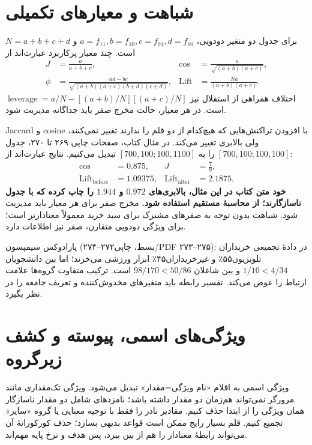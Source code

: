 \section{شباهت و معیارهای تکمیلی}

برای جدول دو متغیر دودویی، $a=f_{11},b=f_{10},c=f_{01},d=f_{00}$ و $N=a+b+c+d$ است. چند معیار پرکاربرد عبارت‌اند از
\begin{align*}
J&=\frac a{a+b+c},&\operatorname{cos}&=\frac a{\sqrt{(a+b)(a+c)}},\\
\phi&=\frac{ad-bc}{\sqrt{(a+b)(a+c)(b+d)(c+d)}},&\operatorname{Lift}&=\frac{Na}{(a+b)(a+c)}.
\end{align*}
اختلاف همراهی از استقلال نیز $\operatorname{leverage}=a/N-[(a+b)/N][(a+c)/N]$ است. در هر معیار، حالت مخرج صفر باید جداگانه مدیریت شود.

Jaccard و cosine با افزودن تراکنش‌هایی که هیچ‌کدام از دو قلم را ندارند تغییر نمی‌کنند، ولی بالابری تغییر می‌کند. در مثال کتاب، صفحات چاپی ۲۶۹ تا ۲۷۰، جدول $[700,100;100,100]$ را به $[700,100;100,1100]$ تبدیل می‌کنیم. نتایج عبارت‌اند از:
\begin{align*}
\operatorname{cos}&=0.875,& J&=\frac79,\\
\operatorname{Lift}_{\mathrm{before}}&=1.09375,&
\operatorname{Lift}_{\mathrm{after}}&=2.1875.
\end{align*}
\textbf{خود متن کتاب در این مثال، بالابری‌های $0.972$ و $1.944$ را چاپ کرده که با جدول ناسازگارند؛ از محاسبهٔ مستقیم استفاده شود.} مخرج صفر برای هر معیار باید مدیریت شود. شباهت بدون توجه به صفرهای مشترک برای سبد خرید معمولاً معنادارتر است؛ برای ویژگی دودویی متقارن، صفر نیز اطلاعات دارد.

پارادوکس سیمپسون (بسط، چاپی۲۷۲--۲۷۴/PDF ۲۷۳--۲۷۵): در دادهٔ تجمیعی خریداران تلویزیون۵۵٪ و غیرخریداران۴۵٪ ابزار ورزشی می‌خرند؛ اما بین دانشجویان $1/10<4/34$ و بین شاغلان $98/170<50/86$ است. ترکیب متفاوت گروه‌ها علامت ارتباط را عوض می‌کند. تفسیر رابطه باید متغیرهای مخدوش‌کننده و تعریف جامعه را در نظر بگیرد.

\section{ویژگی‌های اسمی، پیوسته و کشف زیرگروه}

ویژگی اسمی به اقلام «نام ویژگی=مقدار» تبدیل می‌شود. ویژگی تک‌مقداری مانند مرورگر نمی‌تواند هم‌زمان دو مقدار داشته باشد؛ نامزدهای شامل دو مقدار ناسازگار همان ویژگی را از ابتدا حذف کنیم. مقادیر نادر را فقط با توجیه معنایی یا گروه «سایر» تجمیع کنیم. قلم بسیار رایج ممکن است قواعد بدیهی بسازد؛ حذف کورکورانهٔ آن می‌تواند رابطهٔ معنادار را هم از بین ببرد، پس هدف و نرخ پایه مهم‌اند.

